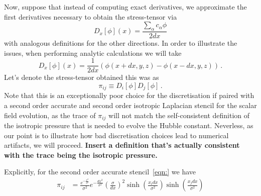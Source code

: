\documentclass{revtex4}
\begin{document}
Now, suppose that instead of computing exact derivatives, we approximate the first derivatives necessary to obtain the stress-tensor via
\begin{equation}
  D_x[\phi](x) = \frac{\sum_{\alpha}c_\alpha \phi}{2dx}
\end{equation}
with analogous definitions for the other directions.
In order to illustrate the issues, when performing analytic calculations we will take
\begin{equation}
  D_x[\phi](x) = \frac{1}{2dx}\left(\phi(x+dx,y,z)-\phi(x-dx,y,z)\right) \, .
\end{equation}
Let's denote the stress-tensor obtained this was as
\begin{equation}
  \pi_{ij} \equiv D_i[\phi]D_j[\phi] \, .
\end{equation}
Note that this is an exceptionally poor choice for the discretisation if paired with a second order accurate and second order isotropic Laplacian stencil for the scalar field evolution, as the trace of $\pi_{ij}$ will not match the self-consistent definition of the isotropic pressure that is needed to evolve the Hubble constant.
Neverless, as our point is to illustrate how bad discretisation choices lead to numerical artifacts, we will proceed.
{\bf Insert a definition that's actually consistent with the trace being the isotropic pressure.}

Explicitly, for the second order accurate stencil~\eqref{eqn:} we have
\begin{align}
  \pi_{ij} &= \frac{e^{-\frac{x^2}{\sigma^2}}}{\sigma^2}e^{-\frac{dx^2}{\sigma^2}}\left(\frac{\sigma}{dx}\right)^2\sinh\left(\frac{x_idx}{\sigma^2}\right)\sinh\left(\frac{x_jdx}{\sigma^2}\right) 
\end{align}
\end{document}
